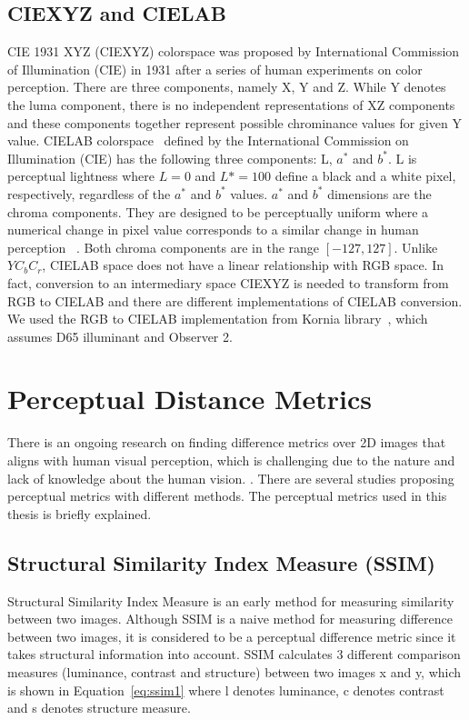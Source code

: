 \subsection{CIEXYZ and CIELAB}
CIE 1931 XYZ (CIEXYZ) colorspace was proposed by International Commission of Illumination (CIE) in 1931 after a series of human experiments on color perception. There are three components, namely X, Y and Z. While Y denotes the luma component, there is no independent representations of XZ components and these components together represent possible chrominance values for given Y value.
CIELAB colorspace~\cite{schanda2007colorimetry} defined by the International Commission on Illumination (CIE) has the following three components: L, \(a^*\) and \(b^*\). L is perceptual lightness where \(L = 0\) and \(L* = 100\) define a black and a white pixel, respectively, regardless of the \(a^*\) and \(b^*\) values. \(a^*\) and \(b^*\) dimensions are the chroma components. They are designed to be perceptually uniform where a numerical change in pixel value corresponds to a similar change in human perception ~\cite{mahy1992luminancevschroma}. Both chroma components are in the range \([-127, 127]\). Unlike \(YC_{b}C_{r}\), CIELAB space does not have a linear relationship with RGB space. In fact, conversion to an intermediary space CIEXYZ is needed to transform from RGB to CIELAB and there are different implementations of CIELAB conversion. We used the RGB to CIELAB implementation from Kornia library~\cite{riba2020kornia}, which assumes D65 illuminant and Observer 2.

\section{Perceptual Distance Metrics}
There is an ongoing research on finding difference metrics over 2D images that aligns with human visual perception, which is challenging due to the nature and lack of knowledge about the human vision. \cite{ding2021comparison}. There are several studies proposing perceptual metrics with different methods. The perceptual metrics used in this thesis is briefly explained.

\subsection{Structural Similarity Index Measure (SSIM)}
Structural Similarity Index Measure is an early method for measuring similarity between two images. Although SSIM is a naive method for measuring difference between two images, it is considered to be a perceptual difference metric since it takes structural information into account. SSIM calculates 3 different comparison measures (luminance, contrast and structure) between two images x and y, which is shown in Equation~\ref{eq:ssim1} where l denotes luminance, c denotes contrast and s denotes structure measure.

